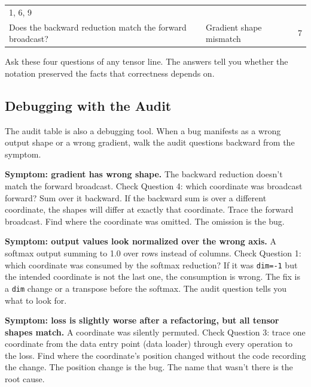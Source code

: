 \documentclass[11pt,titlepage]{article}
\begin{document}
\begin{longtable}[]{@{}lll@{}}
\begin{minipage}[t]{0.30\columnwidth}
1, 6, 9\strut
\end{minipage}\tabularnewline
\begin{minipage}[t]{0.30\columnwidth}\raggedright
Does the backward reduction match the forward broadcast?\strut
\end{minipage} & \begin{minipage}[t]{0.30\columnwidth}\raggedright
Gradient shape mismatch\strut
\end{minipage} & \begin{minipage}[t]{0.30\columnwidth}\raggedright
7\strut
\end{minipage}\tabularnewline
\bottomrule
\end{longtable}

Ask these four questions of any tensor line. The answers tell you
whether the notation preserved the facts that correctness depends on.

\vspace{2em}

\hypertarget{debugging-with-the-audit}{%
\subsection{Debugging with the Audit}\label{debugging-with-the-audit}}

The audit table is also a debugging tool. When a bug manifests as a
wrong output shape or a wrong gradient, walk the audit questions
backward from the symptom.

\textbf{Symptom: gradient has wrong shape.} The backward reduction
doesn't match the forward broadcast. Check Question 4: which coordinate
was broadcast forward? Sum over it backward. If the backward sum is over
a different coordinate, the shapes will differ at exactly that
coordinate. Trace the forward broadcast. Find where the coordinate was
omitted. The omission is the bug.

\textbf{Symptom: output values look normalized over the wrong axis.} A
softmax output summing to 1.0 over rows instead of columns. Check
Question 1: which coordinate was consumed by the softmax reduction? If
it was \texttt{dim=-1} but the intended coordinate is not the last one,
the consumption is wrong. The fix is a \texttt{dim} change or a
transpose before the softmax. The audit question tells you what to look
for.

\textbf{Symptom: loss is slightly worse after a refactoring, but all
tensor shapes match.} A coordinate was silently permuted. Check Question
3: trace one coordinate from the data entry point (data loader) through
every operation to the loss. Find where the coordinate's position
changed without the code recording the change. The position change is
the bug. The name that wasn't there is the root cause.
\end{document}
